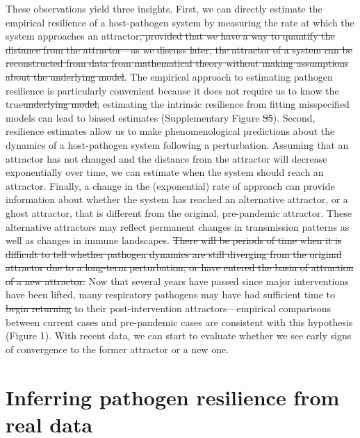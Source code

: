 \documentclass[12pt]{article}
\providecommand{\DIFaddtex}[1]{{\protect\color{blue}\uwave{#1}}} %
\providecommand{\DIFdeltex}[1]{{\protect\color{red}\sout{#1}}}                      %
\providecommand{\DIFaddbegin}{} %
\providecommand{\DIFaddend}{} %
\providecommand{\DIFdelbegin}{} %
\providecommand{\DIFdelend}{} %
\providecommand{\DIFadd}[1]{\texorpdfstring{\DIFaddtex{#1}}{#1}} %
\providecommand{\DIFdel}[1]{\texorpdfstring{\DIFdeltex{#1}}{}} %
\newcommand{\DIFscaledelfig}{0.5}
\newlength{\DIFdelgraphicswidth} %
\newlength{\DIFdelgraphicsheight} %
\newcommand{\DIFaddincludegraphics}[2][]{{\color{blue}\fbox{\DIFOincludegraphics[#1]{#2}}}} %
\newcommand{\DIFdelincludegraphics}[2][]{%
\sbox{\DIFdelgraphicsbox}{\DIFOincludegraphics[#1]{#2}}%
\settoboxwidth{\DIFdelgraphicswidth}{\DIFdelgraphicsbox} %
\settoboxtotalheight{\DIFdelgraphicsheight}{\DIFdelgraphicsbox} %
\scalebox{\DIFscaledelfig}{%
\parbox[b]{\DIFdelgraphicswidth}{\usebox{\DIFdelgraphicsbox}\\[-\baselineskip] \rule{\DIFdelgraphicswidth}{0em}}\llap{\resizebox{\DIFdelgraphicswidth}{\DIFdelgraphicsheight}{%
\setlength{\unitlength}{\DIFdelgraphicswidth}%
\begin{picture}(1,1)%
\thicklines\linethickness{2pt} %
{\color[rgb]{1,0,0}\put(0,0){\framebox(1,1){}}}%
{\color[rgb]{1,0,0}\put(0,0){\line( 1,1){1}}}%
{\color[rgb]{1,0,0}\put(0,1){\line(1,-1){1}}}%
\end{picture}%
}\hspace*{3pt}}} %
} %
\DeclareRobustCommand{\DIFaddbegin}{\DIFOaddbegin \let\includegraphics\DIFaddincludegraphics} %
\DeclareRobustCommand{\DIFaddend}{\DIFOaddend \let\includegraphics\DIFOincludegraphics} %
\DeclareRobustCommand{\DIFdelbegin}{\DIFOdelbegin \let\includegraphics\DIFdelincludegraphics} %
\DeclareRobustCommand{\DIFdelend}{\DIFOaddend \let\includegraphics\DIFOincludegraphics} %
\begin{document}
These observations yield three insights.
First, we can directly estimate the empirical resilience of a host-pathogen system by measuring the rate at which the system approaches an attractor\DIFdelbegin \DIFdel{, provided that we have a way to quantify the distance from the attractor---as we discuss later, the attractor of a system can be reconstructed from data from mathematical theory without making assumptions about the underlying model}\DIFdelend .
The empirical approach to estimating pathogen resilience is particularly convenient because it does not require us to know the true\DIFdelbegin \DIFdel{underlying model}\DIFdelend \DIFaddbegin \DIFadd{, underlying data-generating process}\DIFaddend ;
estimating the intrinsic resilience from fitting misspecified models can lead to biased estimates (Supplementary Figure \DIFdelbegin \DIFdel{S5}\DIFdelend \DIFaddbegin \DIFadd{S7}\DIFaddend ).
Second, resilience estimates allow us to make phenomenological predictions about the dynamics of a host-pathogen system following a perturbation.
Assuming that an attractor has not changed and the distance from the attractor will decrease exponentially over time, we can estimate when the system should reach an attractor.
Finally, a change in the (exponential) rate of approach can provide information about whether the system has reached an alternative attractor, or a ghost attractor, that is different from the original, pre-pandemic attractor.
These alternative attractors may reflect permanent changes in transmission patterns as well as changes in immune landscapes.
\DIFdelbegin \DIFdel{There will be periods of time when it is difficult to tell whether pathogen dynamics are still diverging from the original attractor due to a long-term perturbation, or have entered the basin of attraction of a new attractor. 
}\DIFdelend Now that several years have passed since major interventions have been lifted, many respiratory pathogens may have had sufficient time to \DIFdelbegin \DIFdel{begin returning }\DIFdelend \DIFaddbegin \DIFadd{return }\DIFaddend to their post-intervention attractors---empirical comparisons between current cases and pre-pandemic cases are consistent with this hypothesis (Figure 1).
With recent data, we can start to evaluate whether we see early signs of convergence to the former attractor or a new one.

\section*{Inferring pathogen resilience from real data}
\end{document}
